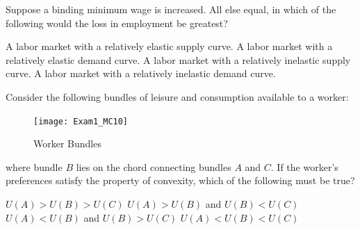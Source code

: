 \documentclass[addpoints,11pt]{exam}
\theoremstyle{definition}
\begin{document}
\begin{questions}
\question Suppose a binding minimum wage is increased. All else equal, in which of the following would the loss in employment be greatest?

\begin{choices}
	\choice A labor market with a relatively elastic supply curve.
	\CorrectChoice A labor market with a relatively elastic demand curve.
	\choice A labor market with a relatively inelastic supply curve.
	\choice A labor market with a relatively inelastic demand curve.
\end{choices}

\question Consider the following bundles of leisure and consumption available to a worker:

\begin{figure}[H]
	\centering
	\texttt{[image: Exam1\_MC10]}
	\caption{Worker Bundles}
\end{figure}
 
where bundle $B$ lies on the chord connecting bundles $A$ and $C$. If the worker's preferences satisfy the property of convexity, which of the following must be true?

\begin{choices}
	\choice $U(A) > U(B) > U(C)$
	\choice $U(A) > U(B)$ and $U(B) < U(C)$
	\CorrectChoice $U(A) < U(B)$ and $U(B)>U(C)$ 
	\choice $U(A) < U(B) < U(C)$
\end{choices}
	
\end{questions}
\end{document}
